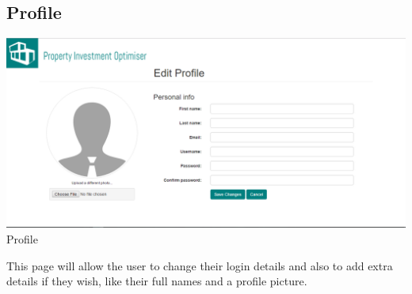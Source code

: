 \documentclass[a4paper,12pt]{article}
\begin{document}
\subsection{Profile}
		\includegraphics[width=0.9\linewidth, center]{./System/Profile.PNG}\\[0.4cm]  
		\caption{Profile}
This page will allow the user to change their login details and also to add extra details if they wish, like their full names and a profile picture.
\end{document}
